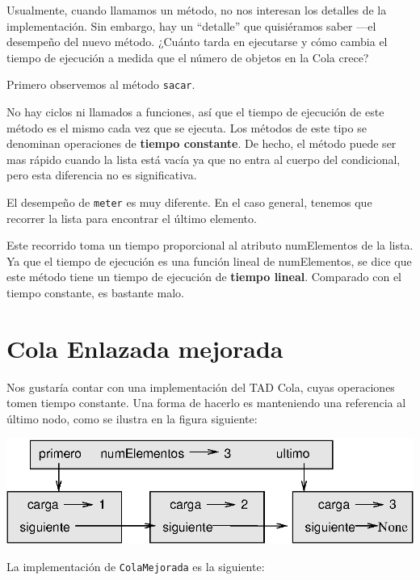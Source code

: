 
Usualmente, cuando llamamos un método, no nos interesan los detalles
de la implementación. Sin embargo, hay un ``detalle'' que quisiéramos
saber —el desempeño del nuevo método. ¿Cuánto tarda en ejecutarse
y cómo cambia el tiempo de ejecución a medida que el número de objetos
en la Cola crece?

Primero observemos al método \texttt{sacar}.

No hay ciclos ni llamados a funciones, así que el tiempo de ejecución
de este método es el mismo cada vez que se ejecuta. Los métodos de
este tipo se denominan operaciones de \textbf{tiempo constante}. De
hecho, el método puede ser mas rápido cuando la lista está vacía ya
que no entra al cuerpo del condicional, pero esta diferencia no es
significativa.


El desempeño de \texttt{meter} es muy diferente. En el caso general,
tenemos que recorrer la lista para encontrar el último elemento.

Este recorrido toma un tiempo proporcional al atributo numElementos
de la lista. Ya que el tiempo de ejecución es una función lineal de
numElementos, se dice que este método tiene un tiempo de ejecución
de \textbf{tiempo lineal}. Comparado con el tiempo constante, es bastante
malo.


\section{Cola Enlazada mejorada}

 

Nos gustaría contar con una implementación del TAD Cola, cuyas operaciones
tomen tiempo constante. Una forma de hacerlo es manteniendo una referencia
al último nodo, como se ilustra en la figura siguiente:

\beforefig \centerline{\includegraphics{illustrations/queue1}}
\afterfig

La implementación de \texttt{ColaMejorada} es la siguiente:

